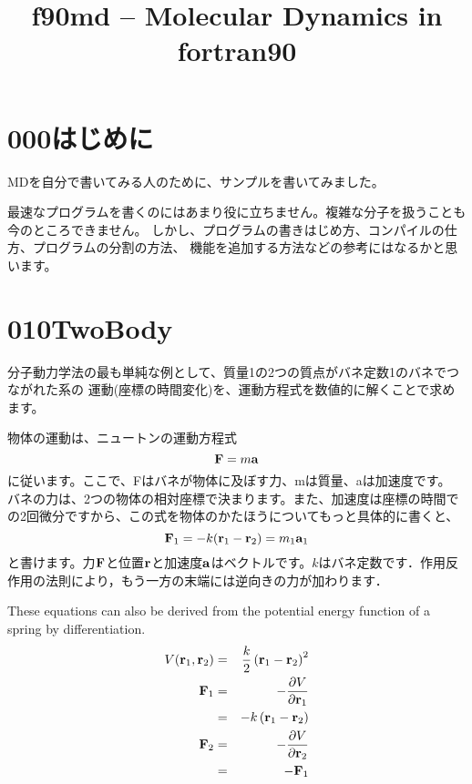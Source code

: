 \documentclass[a4,10pt]{article}
\title{f90md -- Molecular Dynamics in fortran90}
\begin{document}
\maketitle
\section{000はじめに}
MDを自分で書いてみる人のために、サンプルを書いてみました。

最速なプログラムを書くのにはあまり役に立ちません。複雑な分子を扱うことも今のところできません。
しかし、プログラムの書きはじめ方、コンパイルの仕方、プログラムの分割の方法、
機能を追加する方法などの参考にはなるかと思います。


\section{010TwoBody}

分子動力学法の最も単純な例として、質量1の2つの質点がバネ定数1のバネでつながれた系の
運動(座標の時間変化)を、運動方程式を数値的に解くことで求めます。

物体の運動は、ニュートンの運動方程式
\begin{equation}
  {\bf F} = m {\bf a}
\end{equation}
に従います。ここで、Fはバネが物体に及ぼす力、mは質量、aは加速度です。
バネの力は、2つの物体の相対座標で決まります。また、加速度は座標の時間での2回微分ですから、この式を物体のかたほうについてもっと具体的に書くと、
\begin{equation}\label{eq:f_sp}
{\bf F}_1 = -k ({\bf r}_1- {\bf r}_2) = m_1 {\bf a}_1
\end{equation}
と書けます。力$\bf F$と位置$\bf r$と加速度$\bf a$はベクトルです。$k$はバネ定数です．作用反作用の法則により，もう一方の末端には逆向きの力が加わります．

These equations can also be derived from the potential energy function of a spring by differentiation.
\begin{eqnarray}
V({\bf r}_1, {\bf r}_2) &=& \frac{k}{2}\left({\bf r}_1-{\bf
    r}_2\right)^2\\
{\bf F}_1&=& -\frac{\partial V}{\partial{\bf r}_1}\\
&=&-k\left({\bf r}_1-{\bf r}_2\right)\\
{\bf F}_2&=& -\frac{\partial V}{\partial{\bf r}_2}\\
&=&-{\bf F}_1
\end{eqnarray}
\end{document}
